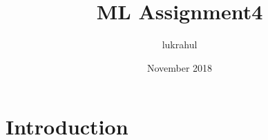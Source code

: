 \documentclass{article}
\title{ML Assignment4}
\author{lukrahul }
\date{November 2018}
\begin{document}
\maketitle

\section{Introduction}
\end{document}
